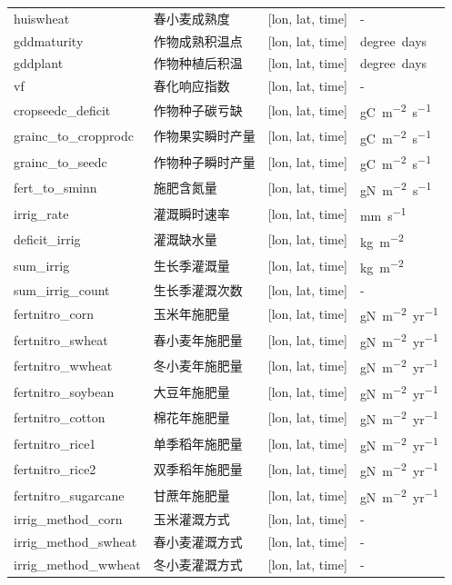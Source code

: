 \documentclass[a4paper,12pt,twoside]{article}
\begin{document}
{\begin{longtable}[htbp]{lp{}ll}
huiswheat & 春小麦成熟度 & {[}lon, lat, time{]} & - \\
gddmaturity & 作物成熟积温点 & {[}lon, lat, time{]} & \unit{degree.days} \\
gddplant & 作物种植后积温 & {[}lon, lat, time{]} & \unit{degree.days} \\
vf & 春化响应指数 & {[}lon, lat, time{]} & - \\
cropseedc\_deficit & 作物种子碳亏缺 & {[}lon, lat, time{]} & \unit{gC.m^{-2}.s^{-1}} \\
grainc\_to\_cropprodc & 作物果实瞬时产量 & {[}lon, lat, time{]} & \unit{gC.m^{-2}.s^{-1}} \\
grainc\_to\_seedc & 作物种子瞬时产量 & {[}lon, lat, time{]} & \unit{gC.m^{-2}.s^{-1}} \\
fert\_to\_sminn & 施肥含氮量 & {[}lon, lat, time{]} & \unit{gN.m^{-2}.s^{-1}} \\
irrig\_rate & 灌溉瞬时速率 & {[}lon, lat, time{]} & \unit{mm.s^{-1}} \\
deficit\_irrig & 灌溉缺水量 & {[}lon, lat, time{]} & \unit{kg.m^{-2}} \\
sum\_irrig & 生长季灌溉量 & {[}lon, lat, time{]} & \unit{kg.m^{-2}} \\
sum\_irrig\_count & 生长季灌溉次数 & {[}lon, lat, time{]} & - \\
fertnitro\_corn & 玉米年施肥量 & {[}lon, lat, time{]} & \unit{gN.m^{-2}.yr^{-1}} \\
fertnitro\_swheat & 春小麦年施肥量 & {[}lon, lat, time{]} & \unit{gN.m^{-2}.yr^{-1}} \\
fertnitro\_wwheat & 冬小麦年施肥量 & {[}lon, lat, time{]} & \unit{gN.m^{-2}.yr^{-1}} \\
fertnitro\_soybean & 大豆年施肥量 & {[}lon, lat, time{]} & \unit{gN.m^{-2}.yr^{-1}} \\
fertnitro\_cotton & 棉花年施肥量 & {[}lon, lat, time{]} & \unit{gN.m^{-2}.yr^{-1}} \\
fertnitro\_rice1 & 单季稻年施肥量 & {[}lon, lat, time{]} & \unit{gN.m^{-2}.yr^{-1}} \\
fertnitro\_rice2 & 双季稻年施肥量 & {[}lon, lat, time{]} & \unit{gN.m^{-2}.yr^{-1}} \\
fertnitro\_sugarcane & 甘蔗年施肥量 & {[}lon, lat, time{]} & \unit{gN.m^{-2}.yr^{-1}} \\
irrig\_method\_corn & 玉米灌溉方式 & {[}lon, lat, time{]} & - \\
irrig\_method\_swheat & 春小麦灌溉方式 & {[}lon, lat, time{]} & - \\
irrig\_method\_wwheat & 冬小麦灌溉方式 & {[}lon, lat, time{]} & - \\

\end{longtable}}
\end{document}
